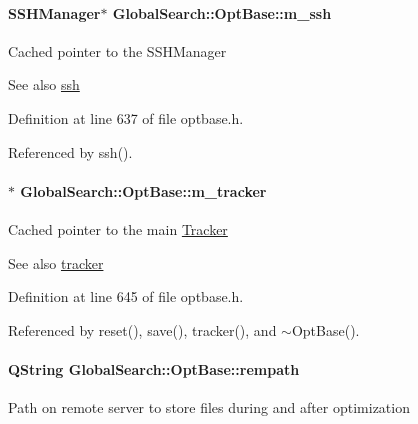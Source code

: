 \paragraph[{m\+\_\+ssh}]{\setlength{\rightskip}{0pt plus 5cm}S\+S\+H\+Manager$\ast$ Global\+Search\+::\+Opt\+Base\+::m\+\_\+ssh\hspace{0.3cm}{\ttfamily [protected]}}\label{classGlobalSearch_1_1OptBase_a723a6dd0bb93aff451007ccb079e2f65}
Cached pointer to the S\+S\+H\+Manager \begin{DoxySeeAlso}{See also}
\hyperlink{classGlobalSearch_1_1OptBase_a40064a3c1e6d0acae26b1908a8bdf5db}{ssh} 
\end{DoxySeeAlso}


Definition at line 637 of file optbase.\+h.



Referenced by ssh().

\hypertarget{classGlobalSearch_1_1OptBase_a60a2c6053a8ae3716854c68d0837b921}{}
\paragraph[{m\+\_\+tracker}]{$\ast$ Global\+Search\+::\+Opt\+Base\+::m\+\_\+tracker\hspace{0.3cm}{\ttfamily [protected]}}\label{classGlobalSearch_1_1OptBase_a60a2c6053a8ae3716854c68d0837b921}
Cached pointer to the main \hyperlink{classGlobalSearch_1_1Tracker}{Tracker} \begin{DoxySeeAlso}{See also}
\hyperlink{classGlobalSearch_1_1OptBase_a304d0d10064bd3913c8089aca76067d6}{tracker} 
\end{DoxySeeAlso}


Definition at line 645 of file optbase.\+h.



Referenced by reset(), save(), tracker(), and $\sim$\+Opt\+Base().

\hypertarget{classGlobalSearch_1_1OptBase_a777ad7fbedbb76f522e02ca73883ab7d}{}
\paragraph[{rempath}]{\setlength{\rightskip}{0pt plus 5cm}Q\+String Global\+Search\+::\+Opt\+Base\+::rempath}\label{classGlobalSearch_1_1OptBase_a777ad7fbedbb76f522e02ca73883ab7d}
Path on remote server to store files during and after optimization 

